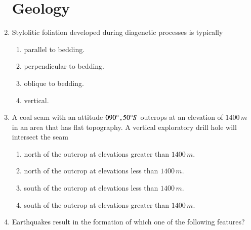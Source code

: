 \documentclass[journal,12pt,onecolumn]{IEEEtran}
\theoremstyle{remark}
\begin{document}
\begin{enumerate}
    \section*{Geology  }
    
    \item Stylolitic foliation developed during diagenetic processes is typically \hfill{}
        \begin{enumerate} 
            \item parallel to bedding.
            \item perpendicular to bedding.
            \item oblique to bedding.
            \item vertical.
        \end{enumerate}
    
    \item A coal seam with an attitude $090\degree \,,50\degree S$ outcrops at an elevation of $1400\,m$ in an area that has flat topography. A vertical exploratory drill hole will intersect the seam \hfill{}
        \begin{enumerate} 
            \item north of the outcrop at elevations greater than $1400\,m$.
            \item north of the outcrop at elevations less than $1400\,m$.
            \item south of the outcrop at elevations less than $1400\,m$.
            \item south of the outcrop at elevations greater than $1400\,m$.
        \end{enumerate}
    
    \item Earthquakes result in the formation of which one of the following features? \hfill{}
        \begin{enumerate} 
        \end{enumerate}
    

\end{enumerate}
\end{document}
